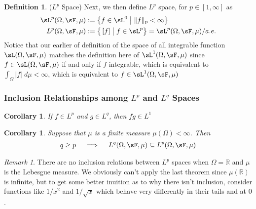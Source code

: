 \documentclass[12pt]{article}
\theoremstyle{plain}
\newtheorem{cor}[thm]{Corollary}
\theoremstyle{definition}
\newtheorem{defn}[thm]{Definition}
\theoremstyle{remark}
\newtheorem*{rmk}{Remark}
\begin{document}
\begin{defn}($L^p$ Space)
Next, we then define $L^p$ space, for $p\in[1,\infty]$ as
\begin{align*}
    \sL^p(\Omega,\sF,\mu)
    &:=\left\{ f\in\sL^0 \;\big|\; \lVert  f\rVert_p < \infty\right\} \\
    L^p(\Omega,\sF,\mu)
    &:=
    \big\{ \, [f] \; \big| \; f \in\sL^p\big\}
    = \sL^p(\Omega,\sF,\mu)/a.e.
\end{align*}
Notice that our earlier of definition of the space of all integrable
function $\sL(\Omega,\sF,\mu)$ matches the definition here of
$\sL^1(\Omega,\sF,\mu)$ since $f\in\sL(\Omega,\sF,\mu)$ if and only if
$f$ integrable, which is equivalent to
$\int_\Omega |f| \; d\mu <\infty$, which is equivalent to
$f\in\sL^1(\Omega,\sF,\mu)$
\end{defn}


\subsubsection{Inclusion Relationships among $L^p$ and $L^q$ Spaces}


\begin{cor}
    If $f\in L^p$ and $g\in L^{q}$, then $fg\in L^1$

\end{cor}


\begin{cor}
Suppose that $\mu$ is a finite measure $\mu(\Omega)<\infty$.
Then
\begin{align*}
  q \geq p
  \quad\implies\quad
  L^q(\Omega,\sF,\mu)
  \subseteq
  L^p(\Omega,\sF,\mu)
\end{align*}
\end{cor}
\begin{rmk}
There are no inclusion relations between $L^p$ spaces when
$\Omega=\mathbb{R}$ and $\mu$ is the Lebesgue measure. We obviously
can't apply the last theorem since $\mu(\mathbb{R})$ is infinite, but to
get some better inuition as to why there isn't inclusion, consider
functions like $1/x^2$ and $1/\sqrt{x}$ which behave very differently in
their tails and at $0$.
\end{rmk}
\end{document}
